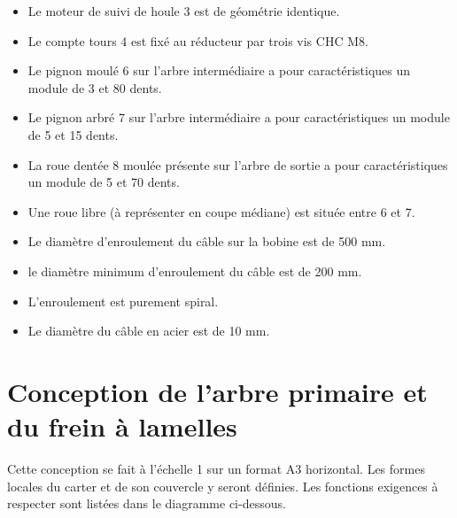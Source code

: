 \documentclass[10pt]{article}
\begin{document}
\begin{itemize}
\item Le moteur de suivi de houle 3 est de géométrie identique.
\item Le compte tours 4 est fixé au réducteur par trois vis CHC M8.
\item Le pignon moulé 6 sur l'arbre intermédiaire a pour caractéristiques un module de 3 et 80 dents.
\item Le pignon arbré 7 sur l'arbre intermédiaire a pour caractéristiques un module de 5 et 15 dents.
\item La roue dentée 8 moulée présente sur l'arbre de sortie a pour caractéristiques un module de 5 et 70 dents.
\item Une roue libre (à représenter en coupe médiane) est située entre 6 et 7.
\item Le diamètre d'enroulement du câble sur la bobine est de 500\; mm.
\item le diamètre minimum d'enroulement du câble est de 200 \; mm.
\item L'enroulement est purement spiral.
\item Le diamètre du câble en acier est de 10 mm.
\end{itemize}

\section{Conception de l'arbre primaire et du frein à lamelles}
Cette conception se fait à l'échelle 1 sur un format A3 horizontal. Les formes locales du carter et de son couvercle y seront définies. Les fonctions exigences à respecter sont listées dans le diagramme ci-dessous.
 
\end{document}
